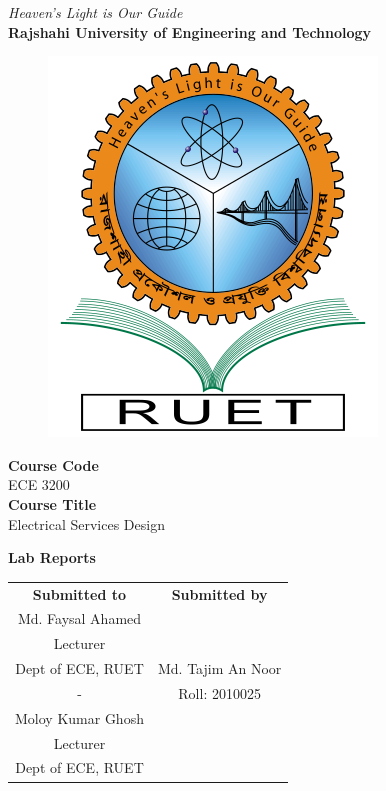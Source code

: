 \vspace*{\fill}
\begin{center}

    \emph{Heaven's Light is Our Guide} \\
    \textbf{Rajshahi University of Engineering and Technology} \\

    \begin{figure}[H]
        \centering
        \includegraphics[scale=.34]{images/RUET_logo.png}
        \label{fig:ruet_logo}
    \end{figure}
    \vspace{5mm}

    \textbf{Course Code}\\
    ECE 3200\\
    \vspace{3mm}
    \textbf{Course Title}\\
    Electrical Services Design

    \vspace{5mm}
    \textbf{Lab Reports}

    \vspace{5mm}

    \begin{tabular}{c|c}
        \textbf{Submitted to} & \textbf{Submitted by} \\
        Md. Faysal Ahamed     &                       \\
        Lecturer              &                       \\
        Dept of ECE, RUET     & Md. Tajim An Noor     \\
        -                     & Roll: 2010025         \\
        Moloy Kumar Ghosh     &                       \\
        Lecturer              &                       \\
        Dept of ECE, RUET     &                       \\
    \end{tabular}

\end{center}
\vspace*{\fill}
